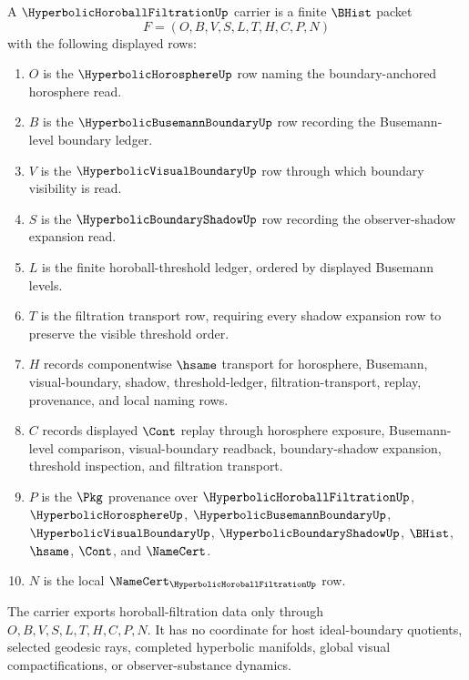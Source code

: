 \begin{definition}
\label{def:hyperbolic-horoball-filtration-carrier}
A $\HyperbolicHoroballFiltrationUp$ carrier is a finite $\BHist$ packet
$$
F=(O,B,V,S,L,T,H,C,P,N)
$$
with the following displayed rows:
\begin{enumerate}
\item $O$ is the $\HyperbolicHorosphereUp$ row naming the boundary-anchored horosphere read.
\item $B$ is the $\HyperbolicBusemannBoundaryUp$ row recording the Busemann-level boundary ledger.
\item $V$ is the $\HyperbolicVisualBoundaryUp$ row through which boundary visibility is read.
\item $S$ is the $\HyperbolicBoundaryShadowUp$ row recording the observer-shadow expansion read.
\item $L$ is the finite horoball-threshold ledger, ordered by displayed Busemann levels.
\item $T$ is the filtration transport row, requiring every shadow expansion row to preserve the visible threshold order.
\item $H$ records componentwise $\hsame$ transport for horosphere, Busemann, visual-boundary, shadow, threshold-ledger, filtration-transport, replay, provenance, and local naming rows.
\item $C$ records displayed $\Cont$ replay through horosphere exposure, Busemann-level comparison, visual-boundary readback, boundary-shadow expansion, threshold inspection, and filtration transport.
\item $P$ is the $\Pkg$ provenance over $\HyperbolicHoroballFiltrationUp$, $\HyperbolicHorosphereUp$, $\HyperbolicBusemannBoundaryUp$, $\HyperbolicVisualBoundaryUp$, $\HyperbolicBoundaryShadowUp$, $\BHist$, $\hsame$, $\Cont$, and $\NameCert$.
\item $N$ is the local $\NameCert_{\HyperbolicHoroballFiltrationUp}$ row.
\end{enumerate}
The carrier exports horoball-filtration data only through $O,B,V,S,L,T,H,C,P,N$. It has no coordinate for host ideal-boundary quotients, selected geodesic rays, completed hyperbolic manifolds, global visual compactifications, or observer-substance dynamics.
\end{definition}

